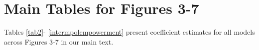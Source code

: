 \section{Main Tables for Figures 3-7}
\appendixpagenumbering
\vspace*{.2in}
\setlength{\parskip}{-2em}
\doublespacing
\setcounter{table}{0}
\setcounter{figure}{0}
\renewcommand{\thetable}{A\arabic{table}}	
\renewcommand{\thefigure}{A\arabic{figure}}	

Tables \ref{tab2}- \ref{intermpolempowerment} present coefficient estimates for all models across Figures 3-7 in our main text.  \\

{\renewcommand\normalsize{\tiny}%
	\normalsize
}

{\renewcommand\normalsize{\tiny}%
	\normalsize
}


\begin{landscape}
{\renewcommand\normalsize{\tiny}%
	\normalsize
}
\end{landscape}

{\renewcommand\normalsize{\tiny}%
	\normalsize
}

{\renewcommand\normalsize{\tiny}%
	\normalsize
}

{\renewcommand\normalsize{\tiny}%
	\normalsize
}

{\renewcommand\normalsize{\tiny}%
	\normalsize
}

{\renewcommand\normalsize{\tiny}%
	\normalsize
}

